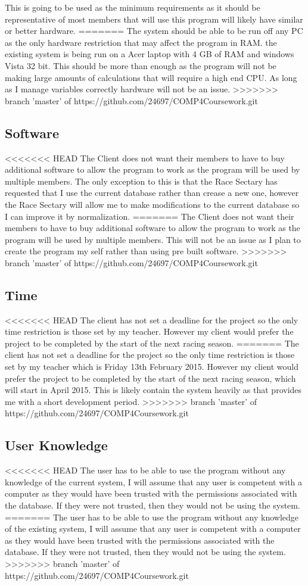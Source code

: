 This is going to be used as the minimum requirements as it should be representative of most members that will use this program will likely have similar or better hardware.
=======
The system should be able to be run off any PC as the only hardware restriction that may affect the program in RAM. the existing system is being run on a Acer laptop with 4 GB of RAM and windows Vista 32 bit. This should be more than enough as the program will not be making large amounts of calculations that will require a high end CPU. As long as I manage variables correctly hardware will not be an issue.
>>>>>>> branch 'master' of https://github.com/24697/COMP4Coursework.git
\subsection{Software}
<<<<<<< HEAD
The Client does not want their members to have to buy additional software to allow the program to work as the program will be used by multiple members. The only exception to this is that the Race Sectary has requested that I use the current database rather than crease a new one, however the Race Sectary will allow me to make modifications to the current database so I can improve it by normalization.
=======
The Client does not want their members to have to buy additional software to allow the program to work as the program will be used by multiple members. This will not be an issue as I plan to create the program my self rather than using pre built software.
>>>>>>> branch 'master' of https://github.com/24697/COMP4Coursework.git
\subsection{Time}
<<<<<<< HEAD
The client has not set a deadline for the project so the only time restriction is those set by my teacher. However my client would prefer the project to be completed by the start of the next racing season.
=======
The client has not set a deadline for the project so the only time restriction is those set by my teacher which is Friday 13th February 2015. However my client would prefer the project to be completed by the start of the next racing season, which will start in April 2015. This is likely contain the system heavily as that provides me with a short development period.
>>>>>>> branch 'master' of https://github.com/24697/COMP4Coursework.git
\subsection{User Knowledge}
<<<<<<< HEAD
The user has to be able to use the program without any knowledge of the current system, I will assume that any user is competent with a computer as they would have been trusted with the permissions associated with the database. If they were not trusted, then they would not be using the system.
=======
The user has to be able to use the program without any knowledge of the existing system, I will assume that any user is competent with a computer as they would have been trusted with the permissions associated with the database. If they were not trusted, then they would not be using the system.
>>>>>>> branch 'master' of https://github.com/24697/COMP4Coursework.git
